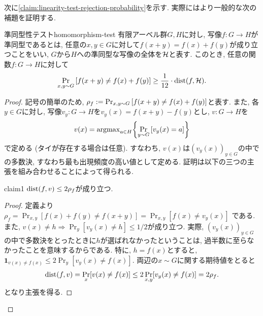   次に\cref{claim:linearity-test-rejection-probability}を示す.
  実際にはより一般的な次の補題を証明する.
  \begin{lemma}{準同型性テスト}{homomorphism-test}
    有限アーベル群$G,H$に対し, 写像$f\colon G\to H$が準同型であるとは, 任意の$x,y\in G$に対して$f(x+y)=f(x)+f(y)$が成り立つことをいい, $G$から$H$への準同型な写像の全体を$\mathcal{H}$と表す.
    このとき, 任意の関数$f\colon G\to H$に対して
    \begin{align*}
      \Pr_{x,y\sim G}\qty[ f(x+y)\ne f(x)+f(y) ] \ge \frac{1}{12}\cdot \mathrm{dist}(f,\mathcal{H}).
    \end{align*}
  \end{lemma}
  \begin{proof}
    記号の簡単のため, $\rho_f:=\Pr_{x,y\sim G}\qty[ f(x+y)\ne f(x)+f(y) ]$と表す.
    また, 各$y\in G$に対し, 写像$v_y\colon G\to H$を$v_y(x)=f(x+y)-f(y)$とし, $v\colon G\to H$を
    \begin{align*}
      v(x) = \mathrm{argmax}_{a \in H} \qty{ \Pr_{y\sim G}\qty[ v_y(x)=a ] }
    \end{align*}
    で定める (タイが存在する場合は任意).
    すなわち, $v(x)$は$(v_y(x))_{y\in G}$の中での多数決, すなわち最も出現頻度の高い値として定める.
    証明は以下の三つの主張を組み合わせることによって得られる.
    
    \begin{claim}{}{claim1}
      $\mathrm{dist}(f,v) \le 2\rho_f$が成り立つ.
    \end{claim}
    \begin{proof}
      定義より$\rho_f = \Pr_{x,y}[f(x) + f(y) \ne f(x+y)] = \Pr_{x,y} [ f(x) \ne v_y(x)]$ である.
      また, $v(x)\ne h\Rightarrow \Pr_y[v_y(x)\ne h]\le 1/2$が成り立つ.
      実際, $(v_y(x))_{y\in G}$の中で多数決をとったときに$h$が選ばれなかったということは, 過半数に至らなかったことを意味するからである.
      特に, $h=f(x)$とすると, $\mathbf{1}_{v(x)\ne f(x)} \le 2\Pr_y[v_y(x)\ne f(x)]$.
      両辺の$x\sim G$に関する期待値をとると
      \begin{align*}
        \mathrm{dist}(f,v) = \Pr_x[v(x)\ne f(x)] \le 2\Pr_{x,y}[v_y(x)\ne f(x)] =2\rho_f.
      \end{align*}
      となり主張を得る.
    \end{proof}
    

\end{proof}
